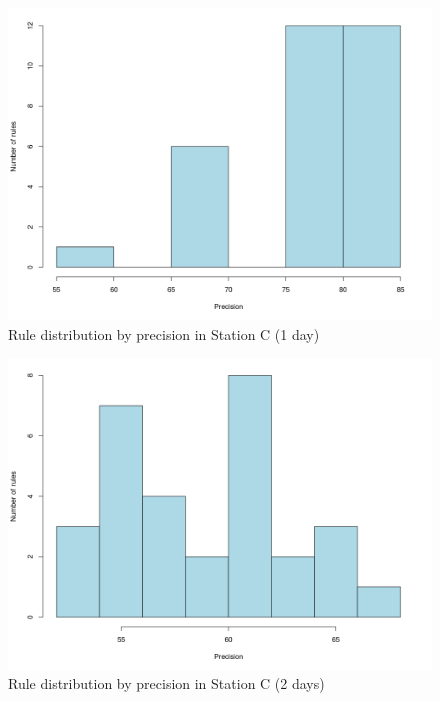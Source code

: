 \begin{figure}[hbtp]
\includegraphics[width=\textwidth]{img/hist_seg1.png}
\caption{Rule distribution by precision in Station C (1 day)} \label{fig:hist_seg1}
\end{figure}

\begin{figure}[hbtp]
\includegraphics[width=\textwidth]{img/hist_seg2.png}
\caption{Rule distribution by precision in Station C (2 days)} \label{fig:hist_seg2}
\end{figure}

